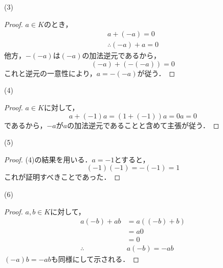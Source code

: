 \documentclass[dvipdfmx,uplatex,11pt]{jsarticle}
\begin{document}
    \begin{itembox}[c]{(3)}
        \begin{proof}
$a \in K$のとき，
\begin{gather*}
    a+(-a)=0 \\
    \therefore (-a)+a =0
\end{gather*}
他方，$-(-a)$は$(-a)$の加法逆元であるから，
\[
    (-a)+(-(-a))=0
\]
これと逆元の一意性により，$a=-(-a)$が従う．
\end{proof}
\end{itembox}
\begin{itembox}[c]{(4)}
    \begin{proof}
    $a \in K$に対して，
    \[
        a+(-1)a=(1+(-1))a =0a =0
    \]
    であるから，$-a$が$a$の加法逆元であることと含めて主張が従う．
    \end{proof}
\end{itembox}
\newpage 
\begin{itembox}[c]{(5)}
    \begin{proof}
    (4)の結果を用いる．$a=-1$とすると，
    \[
        (-1)(-1)=-(-1)=1
    \]
    これが証明すべきことであった．
    \end{proof}
\end{itembox}
\begin{itembox}[c]{(6)}
    \begin{proof}
    $a,b \in K$に対して，
    \begin{align*}
     a(-b)+ab & = a((-b)+b) \\
     & = a0 \\
    & =0 \\
\therefore \quad & a(-b)=-ab 
    \end{align*}
$(-a)b = -ab$も同様にして示される．
\end{proof}
\end{itembox}
%
\newpage
\end{document}
